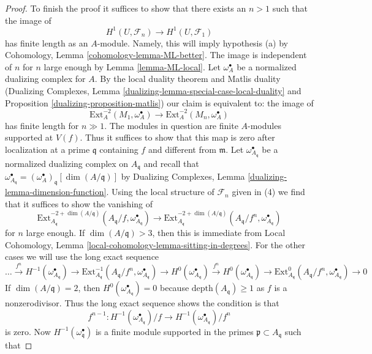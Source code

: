 \begin{proof}
\medskip\noindent
To finish the proof it suffices to show that there exists an $n > 1$
such that the image of
$$
H^1(U, \mathcal{F}_n) \longrightarrow H^1(U, \mathcal{F}_1)
$$
has finite length as an $A$-module. Namely, this will imply hypothesis (a)
by Cohomology, Lemma \ref{cohomology-lemma-ML-better}. The image is independent
of $n$ for $n$ large enough by Lemma \ref{lemma-ML-local}.
Let $\omega_A^\bullet$ be a normalized dualizing complex for $A$.
By the local duality theorem and Matlis duality
(Dualizing Complexes, Lemma \ref{dualizing-lemma-special-case-local-duality}
and Proposition \ref{dualizing-proposition-matlis})
our claim is equivalent to: the image of
$$
\text{Ext}^{-2}_A(M_1, \omega_A^\bullet) \to
\text{Ext}^{-2}_A(M_n, \omega_A^\bullet)
$$
has finite length for $n \gg 1$. The modules in question are
finite $A$-modules supported at $V(f)$. Thus it suffices to show that this
map is zero after localization at a prime $\mathfrak q$
containing $f$ and different from $\mathfrak m$.
Let $\omega_{A_\mathfrak q}^\bullet$ be a normalized
dualizing complex on $A_\mathfrak q$ and recall that
$\omega_{A_\mathfrak q}^\bullet =
(\omega_A^\bullet)_\mathfrak q[\dim(A/\mathfrak q)]$ by
Dualizing Complexes, Lemma \ref{dualizing-lemma-dimension-function}.
Using the local structure of $\mathcal{F}_n$ given in (4)
we find that it suffices to show the vanishing of
$$
\text{Ext}^{-2 + \dim(A/\mathfrak q)}_{A_\mathfrak q}(
A_\mathfrak q/f, \omega_{A_\mathfrak q}^\bullet)
\to
\text{Ext}^{-2 + \dim(A/\mathfrak q)}_{A_\mathfrak q}(
A_\mathfrak q/f^n, \omega_{A_\mathfrak q}^\bullet)
$$
for $n$ large enough. If $\dim(A/\mathfrak q) > 3$, then this is immediate from
Local Cohomology, Lemma \ref{local-cohomology-lemma-sitting-in-degrees}.
For the other cases we will use the long exact sequence
$$
\ldots
\xrightarrow{f^n}
H^{-1}(\omega_{A_\mathfrak q}^\bullet)
\to
\text{Ext}^{-1}_{A_\mathfrak q}(
A_\mathfrak q/f^n, \omega_{A_\mathfrak q}^\bullet) \to
H^0(\omega_{A_\mathfrak q}^\bullet)
\xrightarrow{f^n}
H^0(\omega_{A_\mathfrak q}^\bullet)
\to
\text{Ext}^0_{A_\mathfrak q}(
A_\mathfrak q/f^n, \omega_{A_\mathfrak q}^\bullet) \to 0
$$
If $\dim(A/\mathfrak q) = 2$, then
$H^0(\omega_{A_\mathfrak q}^\bullet) = 0$
because $\text{depth}(A_\mathfrak q) \geq 1$ as
$f$ is a nonzerodivisor.
Thus the long exact sequence shows the condition is that
$$
f^{n - 1} :
H^{-1}(\omega_{A_\mathfrak q}^\bullet)/f \to
H^{-1}(\omega_{A_\mathfrak q}^\bullet)/f^n
$$
is zero. Now $H^{-1}(\omega^\bullet_\mathfrak q)$ is a finite
module supported in the primes $\mathfrak p \subset A_\mathfrak q$ such that

\end{proof}
